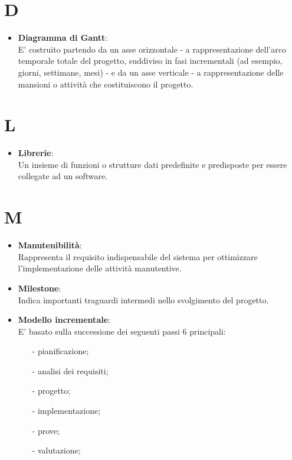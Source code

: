 \documentclass[a4paper, oneside, openany, dvipsnames, table]{article}
\begin{document}
\newpage
\section{D}
\begin{itemize}
\item \textbf{Diagramma di Gantt}:\\	E' costruito partendo da un asse orizzontale - a rappresentazione dell'arco temporale totale del progetto, suddiviso in fasi incrementali (ad esempio, giorni, settimane, mesi) - e da un asse verticale - a rappresentazione delle mansioni o attività che costituiscono il progetto.
\end{itemize}


\newpage
\section{L}
\begin{itemize}
\item \textbf{Librerie}:\\	Un insieme di funzioni o strutture dati predefinite e predisposte per essere collegate ad un software.
\end{itemize}


\newpage
\section{M}
\begin{itemize}
\item \textbf{Manutenibilità}:\\	Rappresenta il requisito indispensabile del sistema per ottimizzare l'implementazione delle attività manutentive.

\end{itemize}

\begin{itemize}
\item \textbf{Milestone}:\\		Indica importanti traguardi intermedi nello svolgimento del progetto.
\end{itemize}

\begin{itemize}
\item \textbf{Modello incrementale}:\\	E' basato sulla successione dei seguenti passi 6 principali:
\begin{itemize}
\item[-]pianificazione;
\item[-]analisi dei requisiti;
\item[-]progetto;
\item[-]implementazione;
\item[-]prove;
\item[-]valutazione;
\end{itemize}
\end{itemize}
\end{document}
